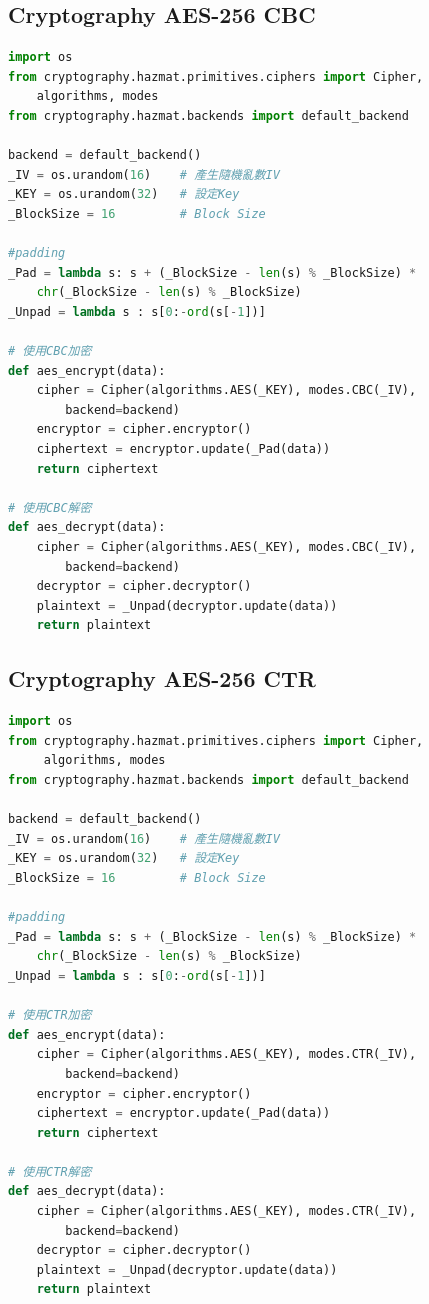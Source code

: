\documentclass[12pt,a4paper]{article}
\begin{document}
\subsection{Cryptography AES-256 CBC}
{
\begin{lstlisting}[language=Python]
import os
from cryptography.hazmat.primitives.ciphers import Cipher, 
	algorithms, modes
from cryptography.hazmat.backends import default_backend

backend = default_backend()
_IV = os.urandom(16)    # 產生隨機亂數IV
_KEY = os.urandom(32)	# 設定Key
_BlockSize = 16	        # Block Size

#padding
_Pad = lambda s: s + (_BlockSize - len(s) % _BlockSize) * 
	chr(_BlockSize - len(s) % _BlockSize)
_Unpad = lambda s : s[0:-ord(s[-1])]

# 使用CBC加密
def aes_encrypt(data):
    cipher = Cipher(algorithms.AES(_KEY), modes.CBC(_IV), 
    	backend=backend)
    encryptor = cipher.encryptor()
    ciphertext = encryptor.update(_Pad(data))
    return ciphertext

# 使用CBC解密
def aes_decrypt(data):
    cipher = Cipher(algorithms.AES(_KEY), modes.CBC(_IV), 
    	backend=backend)
    decryptor = cipher.decryptor()
    plaintext = _Unpad(decryptor.update(data))
    return plaintext
\end{lstlisting}
}

\subsection{Cryptography AES-256 CTR}
{
\begin{lstlisting}[language=Python]
import os
from cryptography.hazmat.primitives.ciphers import Cipher,
	 algorithms, modes
from cryptography.hazmat.backends import default_backend

backend = default_backend()
_IV = os.urandom(16)    # 產生隨機亂數IV
_KEY = os.urandom(32)	# 設定Key
_BlockSize = 16	        # Block Size

#padding
_Pad = lambda s: s + (_BlockSize - len(s) % _BlockSize) * 
	chr(_BlockSize - len(s) % _BlockSize)
_Unpad = lambda s : s[0:-ord(s[-1])]

# 使用CTR加密
def aes_encrypt(data):
    cipher = Cipher(algorithms.AES(_KEY), modes.CTR(_IV), 
    	backend=backend)
    encryptor = cipher.encryptor()
    ciphertext = encryptor.update(_Pad(data))
    return ciphertext

# 使用CTR解密
def aes_decrypt(data):
    cipher = Cipher(algorithms.AES(_KEY), modes.CTR(_IV), 
    	backend=backend)
    decryptor = cipher.decryptor()
    plaintext = _Unpad(decryptor.update(data))
    return plaintext
\end{lstlisting}
}
\end{document}

